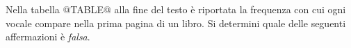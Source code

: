 Nella tabella @TABLE@ alla fine del testo è riportata la frequenza 
con cui ogni vocale compare nella prima pagina di un libro.
Si determini quale delle seguenti affermazioni è 
\emph{falsa}.